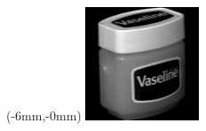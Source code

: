\documentclass[a4paper,12pt]{article}
\begin{document}
\begin{titlepage}
\begin{textblock*}{297mm}(-6mm,-0mm)
\includegraphics[width=\paperwidth]
{frontpages/obj10__64.png}\end{textblock*} \
\end{titlepage}
\setlength{\columnseprule}{0.5pt}
\begin{multicols}{2}
\tableofcontents
\end{multicols}
\pagebreak
\end{document}
